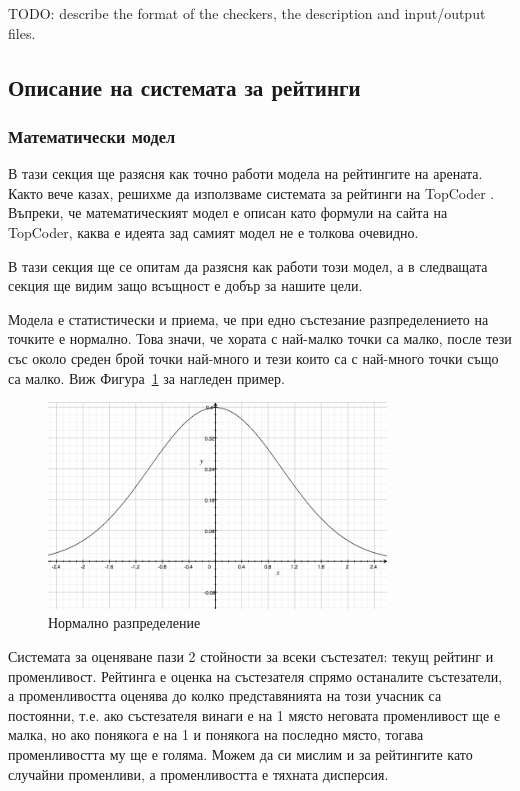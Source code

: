 \documentclass[a4paper,12pt]{article}
\begin{document}
    TODO: describe the format of the checkers, the description and input/output files.
  \subsection{Описание на системата за рейтинги}
  
  
  \subsubsection{Математически модел}
  В тази секция ще разясня как точно работи модела на рейтингите на арената. Както вече казах, решихме да използваме системата за рейтинги на TopCoder \cite{topcoder_ratings}. Въпреки, че математическият модел е описан като формули на сайта на TopCoder, каква е идеята зад самият модел не е толкова очевидно.

  В тази секция ще се опитам да разясня как работи този модел, а в следващата секция ще видим защо всъщност е добър за нашите цели.
  
  Модела е статистически и приема, че при едно състезание разпределението на точките е нормално. Това значи, че хората с най-малко точки са малко, после тези със около среден брой точки най-много и тези които са с най-много точки също са малко. Виж Фигура~\ref{normal_distribution} за нагледен пример.
  
  \begin{figure}
    \begin{center}
      \includegraphics[width=0.8\textwidth]{normal_distribution.png}
    \end{center}
    \caption{Нормално разпределение}
    \label{normal_distribution}
  \end{figure}
  
  Системата за оценяване пази 2 стойности за всеки състезател: текущ рейтинг и променливост. Рейтинга е оценка на състезателя спрямо останалите състезатели, а променливостта оценява до колко представянията на този учасник са постоянни, т.е. ако състезателя винаги е на 1 място неговата променливост ще е малка, но ако понякога е на 1 и понякога на последно място, тогава променливостта му ще е голяма. Можем да си мислим и за рейтингите като случайни променливи, а променливостта е тяхната дисперсия. 
  
\end{document}

